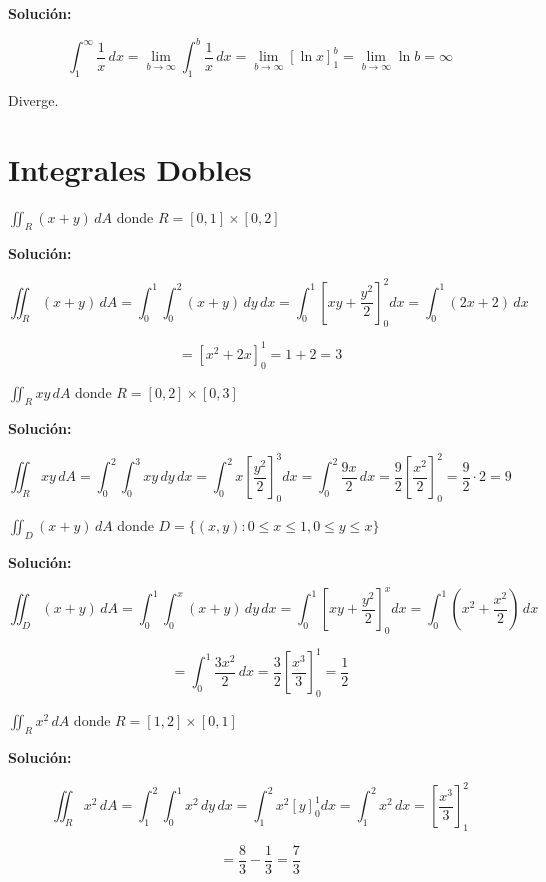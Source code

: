 \documentclass[12pt, a4paper]{book}
\begin{document}
\textbf{Solución:}

\[
\int_1^\infty \frac{1}{x} \, dx = \lim_{b \to \infty} \int_1^b \frac{1}{x} \, dx = \lim_{b \to \infty} [\ln x]_1^b = \lim_{b \to \infty} \ln b = \infty
\]

Diverge.

\section{Integrales Dobles}

\begin{ejercicio}
$\iint_R (x+y) \, dA$ donde $R = [0,1] \times [0,2]$
\end{ejercicio}

\textbf{Solución:}

\[
\iint_R (x+y) \, dA = \int_0^1 \int_0^2 (x+y) \, dy \, dx = \int_0^1 [xy + \frac{y^2}{2}]_0^2 dx = \int_0^1 (2x + 2) \, dx
\]

\[
= [x^2 + 2x]_0^1 = 1 + 2 = 3
\]

\begin{ejercicio}
$\iint_R xy \, dA$ donde $R = [0,2] \times [0,3]$
\end{ejercicio}

\textbf{Solución:}

\[
\iint_R xy \, dA = \int_0^2 \int_0^3 xy \, dy \, dx = \int_0^2 x[\frac{y^2}{2}]_0^3 dx = \int_0^2 \frac{9x}{2} \, dx = \frac{9}{2}[\frac{x^2}{2}]_0^2 = \frac{9}{2} \cdot 2 = 9
\]

\begin{ejercicio}
$\iint_D (x+y) \, dA$ donde $D = \{(x,y) : 0 \leq x \leq 1, 0 \leq y \leq x\}$
\end{ejercicio}

\textbf{Solución:}

\[
\iint_D (x+y) \, dA = \int_0^1 \int_0^x (x+y) \, dy \, dx = \int_0^1 [xy + \frac{y^2}{2}]_0^x dx = \int_0^1 (x^2 + \frac{x^2}{2}) \, dx
\]

\[
= \int_0^1 \frac{3x^2}{2} \, dx = \frac{3}{2}[\frac{x^3}{3}]_0^1 = \frac{1}{2}
\]

\begin{ejercicio}
$\iint_R x^2 \, dA$ donde $R = [1,2] \times [0,1]$
\end{ejercicio}

\textbf{Solución:}

\[
\iint_R x^2 \, dA = \int_1^2 \int_0^1 x^2 \, dy \, dx = \int_1^2 x^2 [y]_0^1 dx = \int_1^2 x^2 \, dx = [\frac{x^3}{3}]_1^2
\]

\[
= \frac{8}{3} - \frac{1}{3} = \frac{7}{3}
\]
\end{document}
